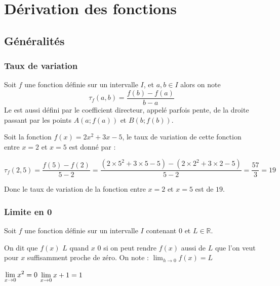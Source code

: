 \documentclass[french]{book}
\newcommand{\R}{\mathbb {R}}
\newcommand{\ds}{\displaystyle}
\newcommand{\limo}[1][x]{\ds\lim_{#1\rightarrow 0}}
\begin{document}
\chapter{Dérivation des fonctions}
\section{Généralités}
\subsection{Taux de variation}
\begin{defn}
Soit $f$ une fonction définie sur un intervalle $I$, et $a,b \in I$ alors on note 
$$\tau_f(a,b)=\dfrac{f(b)-f(a)}{b-a}$$
Le  est aussi défini par le coefficient directeur, appelé parfois pente, de la droite passant par les points $A(a ; f (a))$ et $B (b ; f (b))$.
\end{defn}

\begin{exemple}
Soit la fonction $f(x) = 2x^2 + 3x - 5$, le taux de variation de cette fonction entre $x=2$ et $x=5$ est donné par :

$$\tau_f(2,5)= \frac{f(5) - f(2)}{5 - 2} = \frac{(2 \times 5^2 + 3 \times 5 - 5) - (2 \times 2^2 + 3 \times 2 - 5)}{5 - 2} = \frac{57}{3} = 19 $$

Donc le taux de variation de la fonction entre $x=2$ et $x=5$ est de $19$.

\end{exemple}
\subsection{Limite en 0}
\begin{defn}
Soit $f$ une fonction définie sur un intervalle $I$ contenant 0 et $L \in \R$.

On dit que $f(x)$  $L$ quand $x$  0 si on peut rendre $f(x)$ aussi  de $L$ que l'on veut pour $x$ suffisamment proche de zéro. On note : $\limo[h] f(x)=L$
\end{defn}

\begin{exemple}
$\ds \limo[x]x^{2}=0$ \hspace{1em} $\ds \limo[x]x+1=1$
\end{exemple}
%
\end{document}
